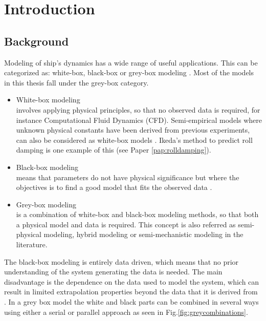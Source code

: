 \chapter{Introduction}
\section{Background}
Modeling of ship’s dynamics has a wide range of useful applications. This can be categorized as: white-box, black-box or grey-box modeling \cite{leifsson_grey-box_2008}. Most of the models in this thesis fall under the grey-box category.

\begin{itemize}
    \item White-box modeling \\
    involves applying physical principles, so that no observed data is required, for instance Computational Fluid Dynamics (CFD). Semi-empirical models where unknown physical constants have been derived from previous experiments, can also be considered as white-box models \cite{leifsson_grey-box_2008}. Ikeda's method to predict roll damping \cite{ikeda_components_1978} is one example of this (see Paper \ref{pap:rolldamping}).  

    \item Black-box modeling \\
    means that parameters do not have physical significance but where the objectives is to find a good model that fits the observed data \cite{lindskog_tools_1995}.
    
    \item Grey-box modeling \\
    is a combination of white-box and black-box modeling methods, so that both a physical model and data is required. This concept is also referred as semi-physical modeling, hybrid modeling or semi-mechanistic modeling \cite{leifsson_grey-box_2008} in the literature. 
\end{itemize}

\noindent The black-box modeling is entirely data driven, which means that no prior understanding of the system generating the data is needed. The main disadvantage is the dependence on the data used to model the system, which can result in limited extrapolation properties beyond the data that it is derived from \cite{leifsson_grey-box_2008}. 
In a grey box model the white and black parts can be combined in several ways using either a serial or parallel approach \cite{leifsson_grey-box_2008} as seen in Fig.\ref{fig:greycombinations}. 

